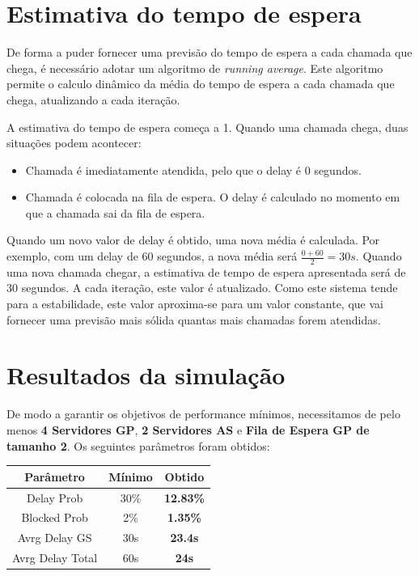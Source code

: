 \section*{Estimativa do tempo de espera}

De forma a puder fornecer uma previsão do tempo de espera a cada chamada que chega, é necessário adotar um algoritmo de \textit{running average}.
Este algoritmo permite o calculo dinâmico da média do tempo de espera a cada chamada que chega, atualizando a cada iteração.

A estimativa do tempo de espera começa a 1. Quando uma chamada chega, duas situações podem acontecer:
\begin{itemize}
    \item Chamada é imediatamente atendida, pelo que o delay é 0 segundos.
    \item Chamada é colocada na fila de espera. O delay é calculado no momento em que a chamada sai da fila de espera.
\end{itemize}

Quando um novo valor de delay é obtido, uma nova média é calculada.
Por exemplo, com um delay de 60 segundos, a nova média será $\frac{0+60}{2}=30s$.
Quando uma nova chamada chegar, a estimativa de tempo de espera apresentada será de 30 segundos.
A cada iteração, este valor é atualizado.
Como este sistema tende para a estabilidade, este valor aproxima-se para um valor constante, que vai fornecer uma previsão mais sólida quantas mais chamadas forem atendidas.


\section*{Resultados da simulação}

De modo a garantir os objetivos de performance mínimos, necessitamos de pelo menos \textbf{4 Servidores GP}, \textbf{2 Servidores AS} e \textbf{Fila de Espera GP de tamanho 2}.
Os seguintes parâmetros foram obtidos:
\begin{center}
    \begin{tabular}{||c|c c||} 
    \hline
    Parâmetro & Mínimo & \textbf{Obtido} \\
    \hline\hline
    Delay Prob & 30\% & \textbf{12.83\%}\\ 
    \hline
    Blocked Prob & 2\% & \textbf{1.35\%}\\
    \hline
    Avrg Delay GS& 30s & \textbf{23.4s}\\
    \hline
    Avrg Delay Total & 60s & \textbf{24s} \\
    \hline
   \end{tabular}
\end{center}

